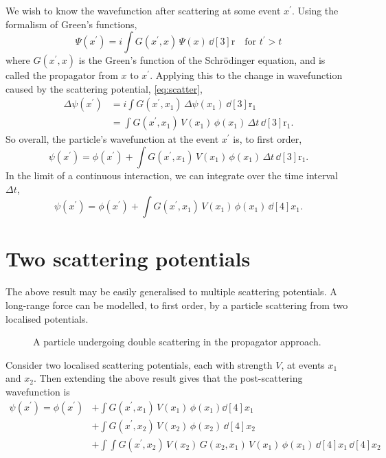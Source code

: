 \documentclass{report}
\renewcommand{\vec}[1]{\bm{\mathrm{#1}}}
\begin{document}
We wish to know the wavefunction after scattering at some event $x^\prime$. Using the formalism of Green's functions,
\begin{equation}\boxed{
\Psi(x^\prime) = i \int G(x^\prime, x) \, \Psi(x) \, \dd[3]{\vec{r}} \quad \text{for $t^\prime > t$}
}\end{equation}
where $G(x^\prime, x)$ is the Green's function of the Schr{\"o}dinger equation, and is called the propagator from $x$ to $x^\prime$. Applying this to the change in wavefunction caused by the scattering potential, \eqref{eq:scatter},
\begin{align}
\Delta\psi(x^\prime) &= i \int G(x^\prime, x_1) \, \Delta\psi(x_1) \, \dd[3]{\vec{r}_1} \\
&= \int G(x^\prime, x_1) \, V(x_1) \, \phi(x_1) \, \Delta{t} \, \dd[3]{\vec{r}_1}.
\end{align}
So overall, the particle's wavefunction at the event $x^\prime$ is, to first order,
\begin{equation}
\psi(x^\prime) = \phi(x^\prime) +  \int G(x^\prime, x_1) \, V(x_1) \, \phi(x_1) \, \Delta{t} \, \dd[3]{\vec{r}_1}
.\end{equation}
In the limit of a continuous interaction, we can integrate over the time interval $\Delta t$,
\begin{equation}\boxed{
\psi(x^\prime) = \phi(x^\prime) +  \int G(x^\prime, x_1) \, V(x_1) \, \phi(x_1) \, \dd[4]{x_1}
}.\end{equation}

\section{Two scattering potentials}
The above result may be easily generalised to multiple scattering potentials. A long-range force can be modelled, to first order, by a particle scattering from two localised potentials.
\begin{figure}[hb]
\centering

\caption{A particle undergoing double scattering in the propagator approach.\label{eq:doubleScatter}}
\end{figure}

Consider two localised scattering potentials, each with strength $V$, at events $x_1$ and $x_2$. Then extending the above result gives that the post-scattering wavefunction is
\begin{align}
\psi(x^\prime) = \phi(x^\prime) &+ \int G(x^\prime, x_1) \, V(x_1) \, \phi(x_1)  \dd[4]{x_1} \nonumber \\
&+ \int G(x^\prime, x_2) \, V(x_2) \, \phi(x_2) \, \dd[4]{x_2} \nonumber \\
&+ \int \int G(x^\prime, x_2) \, V(x_2) \, G (x_2, x_1) \, V(x_1) \, \phi(x_1) \, \dd[4]{x_1} \, \dd[4]{x_2}\label{eq:doubleScatter}
\end{align}
\end{document}
